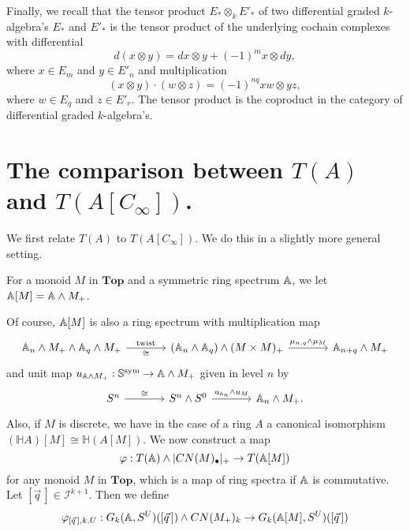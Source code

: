 Finally, we recall that the tensor product $E_\ast\otimes_k E'_\ast$  of
two differential graded $k$-algebra's
$E_\ast$ and $E'_\ast$ is the tensor product of the underlying
cochain complexes with differential
\[
d(x\otimes y) = dx\otimes y + (-1)^m x\otimes dy,
\]
where $x\in E_m$ and $y\in E'_n$ and multiplication
\[
(x\otimes y)\cdot (w\otimes z) = (-1)^{nq}xw\otimes yz,
\]
where $w\in E_q$ and $z\in E'_r$. The tensor product is
the coproduct in the category of differential graded $k$-algebra's.
\section{The comparison between $T(A)$ and $T(A[C_\infty])$.}
We first relate $T(A)$ to $T(A[C_\infty])$. We do this in a slightly more general
setting.
\begin{mydef}
For a monoid $M$ in $\mathbf{Top}$ and a symmetric ring spectrum
$\mathbb{A}$, we let $\mathbb{A}[M] = \mathbb{A}\wedge M_+$. 
\end{mydef}
Of course, $\mathbb{A}[M]$ is also a ring spectrum with multiplication map
\[\begin{tikzcd}[column sep = large]
\A_n\wedge M_+\wedge \A_q\wedge M_+
\arrow{r}[swap]{\cong}{\mathrm{twist}}
&(\A_n\wedge \A_q)\wedge (M\times M)_+
\arrow{r}{\mu_{n,q}\wedge \mu_M}
&\A_{n+q}\wedge M_+
\end{tikzcd}
\]
and unit map $u_{\mathbb{A}\wedge M_+}: \mathbb{S}^{\mathrm{sym}}\to \mathbb{A}\wedge M_+$
given in level $n$ by
\[
\begin{tikzcd}[column sep = large]
S^n\arrow{r}{\cong}
&S^n\wedge S^0
\arrow{r}{u_{\A_n}\wedge u_M}
&\A_n\wedge M_+.
\end{tikzcd}
\]
Also, if $M$ is discrete, we have
in the case of a ring $A$  a canonical isomorphism
$(\mathbb{H}A)[M] \cong \mathbb{H}(A[M])$. We now construct a map
\begin{equation}\label{eq:thhpolynomialextension}
\varphi: T(\mathbb{A})\wedge \lvert CN(M)_\bullet\rvert_+\to T(\mathbb{A}[M])
\end{equation}
for any monoid $M$ in $\mathbf{Top}$, which is a map
of ring spectra if $\mathbb{A}$ is commutative. Let $[\vec{q}\,]\in \mathcal{I}^{k+1}$.
Then we define
\begin{equation}
\varphi_{[\vec{q}\,],k,U} : G_k(\mathbb{A},S^U)([\vec{q}\,])\wedge CN(M_+)_k
\to G_k(\mathbb{A}[M],S^U)([\vec{q}\,])
\end{equation}
